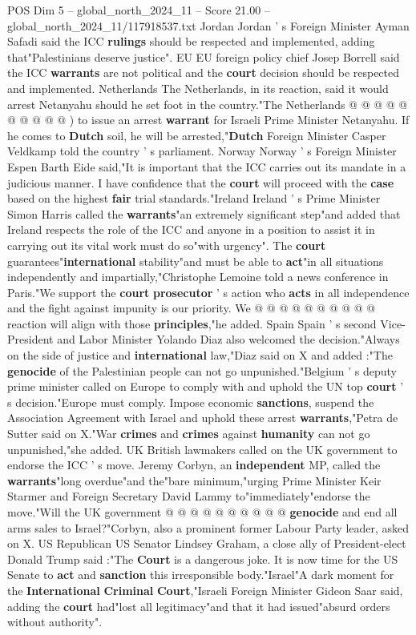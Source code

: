 \begin{textsample}{POS Dim 5 – global\_north\_2024\_11 – Score 21.00 – global\_north\_2024\_11/117918537.txt}
Jordan Jordan ' s Foreign Minister Ayman Safadi said the ICC \textbf{rulings} should be respected and implemented, adding that"Palestinians deserve justice".
EU EU foreign policy chief Josep Borrell said the ICC \textbf{warrants} are not political and the \textbf{court} decision should be respected and implemented.
Netherlands The Netherlands, in its reaction, said it would arrest Netanyahu should he set foot in the country."The Netherlands @ @ @ @ @ @ @ @ @ @ ) to issue an arrest \textbf{warrant} for Israeli Prime Minister Netanyahu.
If he comes to \textbf{Dutch} soil, he will be arrested,"\textbf{Dutch} Foreign Minister Casper Veldkamp told the country ' s parliament.
Norway Norway ' s Foreign Minister Espen Barth Eide said,"It is important that the ICC carries out its mandate in a judicious manner.
I have confidence that the \textbf{court} will proceed with the \textbf{case} based on the highest \textbf{fair} trial standards."Ireland Ireland ' s Prime Minister Simon Harris called the \textbf{warrants}"an extremely significant step"and added that Ireland respects the role of the ICC and anyone in a position to assist it in carrying out its vital work must do so"with urgency".
The \textbf{court} guarantees"\textbf{international} stability"and must be able to \textbf{act}"in all situations independently and impartially,"Christophe Lemoine told a news conference in Paris."We support the \textbf{court} \textbf{prosecutor} ' s action who \textbf{acts} in all independence and the fight against impunity is our priority.
We @ @ @ @ @ @ @ @ @ @ reaction will align with those \textbf{principles},"he added.
Spain Spain ' s second Vice-President and Labor Minister Yolando Diaz also welcomed the decision."Always on the side of justice and \textbf{international} law,"Diaz said on X and added :"The \textbf{genocide} of the Palestinian people can not go unpunished."Belgium ' s deputy prime minister called on Europe to comply with and uphold the UN top \textbf{court} ' s decision."Europe must comply.
Impose economic \textbf{sanctions}, suspend the Association Agreement with Israel and uphold these arrest \textbf{warrants},"Petra de Sutter said on X."War \textbf{crimes} and \textbf{crimes} against \textbf{humanity} can not go unpunished,"she added.
UK British lawmakers called on the UK government to endorse the ICC ' s move.
Jeremy Corbyn, an \textbf{independent} MP, called the \textbf{warrants}"long overdue"and the"bare minimum,"urging Prime Minister Keir Starmer and Foreign Secretary David Lammy to"immediately"endorse the move."Will the UK government @ @ @ @ @ @ @ @ @ @ \textbf{genocide} and end all arms sales to Israel?"Corbyn, also a prominent former Labour Party leader, asked on X.
US Republican US Senator Lindsey Graham, a close ally of President-elect Donald Trump said :"The \textbf{Court} is a dangerous joke.
It is now time for the US Senate to \textbf{act} and \textbf{sanction} this irresponsible body."Israel"A dark moment for the \textbf{International} \textbf{Criminal} \textbf{Court},"Israeli Foreign Minister Gideon Saar said, adding the \textbf{court} had"lost all legitimacy"and that it had issued"absurd orders without authority".


\end{textsample}
